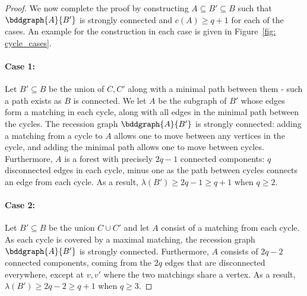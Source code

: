 \begin{proof}
We now complete the proof by constructing $A \subseteq B' \subseteq B$ such that $\bddgraph{A}{B'}$ is strongly connected and $c(A) \geq q+1$ for each of the cases.
An example for the construction in each case is given in Figure~\ref{fig: cycle_cases}.

\paragraph{\bf Case 1:}
Let $B' \subseteq B$ be the union of $C, C'$ along with a minimal path between them - such a path exists as $B$ is connected.
We let $A$ be the subgraph of $B'$ whose edges form a matching in each cycle, along with all edges in the minimal path between the cycles.
The recession graph $\bddgraph{A}{B'}$ is strongly connected: adding a matching from a cycle to $A$ allows one to move between any vertices in the cycle, and adding the minimal path allows one to move between cycles.
Furthermore, $A$ is a forest with precisely $2q-1$ connected components: $q$ disconnected edges in each cycle, minus one as the path between cycles connects an edge from each cycle.
As a result, $\lambda(B') \geq 2q -1 \geq q+1$ when $q \geq 2$. 

\paragraph{\bf Case 2:}
Let $B' \subseteq B$ be the union $C \cup C'$ and let $A$ consist of a matching from each cycle.
As each cycle is covered by a maximal matching, the recession graph $\bddgraph{A}{B'}$ is strongly connected.
Furthermore, $A$ consists of $2q-2$ connected components, coming from the $2q$ edges that are disconnected everywhere, except at $v,v'$ where the two matchings share a vertex.
As a result, $\lambda(B') \geq 2q -2 \geq q+1$ when $q \geq 3$. 


\end{proof}
